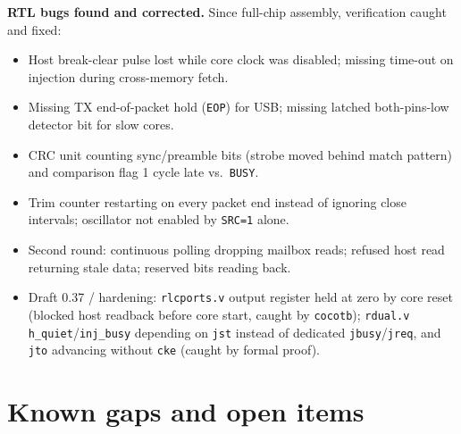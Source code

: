 \documentclass[10pt,a4paper]{article}
\begin{document}
\textbf{RTL bugs found and corrected.} Since full-chip assembly, verification caught and fixed:
\begin{itemize}
\item Host break-clear pulse lost while core clock was disabled; missing time-out on injection during cross-memory fetch.
\item Missing TX end-of-packet hold (\texttt{EOP}) for USB; missing latched both-pins-low detector bit for slow cores.
\item CRC unit counting sync/preamble bits (strobe moved behind match pattern) and comparison flag 1 cycle late vs.\ \texttt{BUSY}.
\item Trim counter restarting on every packet end instead of ignoring close intervals; oscillator not enabled by \texttt{SRC=1} alone.
\item Second round: continuous polling dropping mailbox reads; refused host read returning stale data; reserved bits reading back.
\item Draft 0.37 / hardening: \texttt{rlcports.v} output register held at zero by core reset (blocked host readback before core start, caught by \texttt{cocotb}); \texttt{rdual.v} \texttt{h\_quiet}/\texttt{inj\_busy} depending on \texttt{jst} instead of dedicated \texttt{jbusy}/\texttt{jreq}, and \texttt{jto} advancing without \texttt{cke} (caught by formal proof).
\end{itemize}

\section{Known gaps and open items}\label{sec:gaps}
\end{document}
